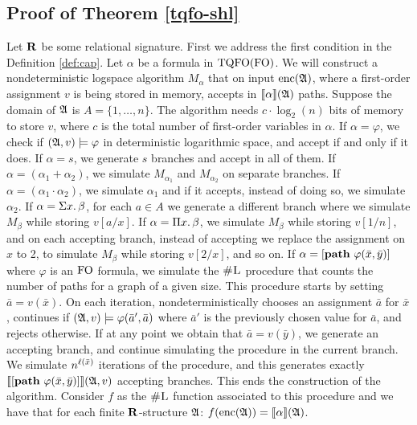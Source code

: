 \subsection*{Proof of Theorem \ref{tqfo-shl}}

Let $\mathbf{R}$ be some relational signature.  First we address the first condition in the Definition \ref{def:cap}. Let $\alpha$ be a formula in ${\rm TQFO}({\rm FO})$. We will construct a nondeterministic logspace algorithm $M_{\alpha}$ that on input ${\rm enc}(\mathfrak{A})$, where a first-order assignment $v$ is being stored in memory, accepts in ${\llbracket{}{\alpha}\rrbracket}(\mathfrak{A})$ paths. Suppose the domain of $\mathfrak{A}$ is $A = \{1,\ldots,n\}$. The algorithm needs $c\cdot\log_2(n)$ bits of memory to store $v$, where $c$ is the total number of first-order variables in $\alpha$. If $\alpha = \varphi$, we check if $(\mathfrak{A},v)\models\varphi$ in deterministic logarithmic space, and accept if and only if it does. If $\alpha = s$, we generate $s$ branches and accept in all of them. If $\alpha = (\alpha_1 + \alpha_2)$, we simulate $M_{\alpha_1}$ and $M_{\alpha_2}$ on separate branches. If $\alpha = (\alpha_1\cdot\alpha_2)$, we simulate $\alpha_1$ and if it accepts, instead of doing so, we simulate $\alpha_2$. If $\alpha = \Sigma{x}.\,\beta$, for each $a\in A$ we generate a different branch where we simulate $M_{\beta}$ while storing $v[a/x]$. If $\alpha = \Pi{x}.\,\beta$, we simulate $M_{\beta}$ while storing $v[1/n]$, and on each accepting branch, instead of accepting we replace the assignment on $x$ to 2, to simulate $M_{\beta}$ while storing $v[2/x]$, and so on. If $\alpha = [{\bf path} \,\, \varphi(\bar{x},\bar{y})]$ where $\varphi$ is an ${\rm FO}$ formula, we simulate the $\text{\sc \#L}$ procedure that counts the number of paths for a graph of a given size. This procedure starts by setting $\bar{a} = v(\bar{x})$. On each iteration, nondeterministically chooses an assignment $\bar{a}$ for $\bar{x}$, continues if $(\mathfrak{A},v)\models\varphi(\bar{a}',\bar{a})$ where $\bar{a}'$ is the previously chosen value for $\bar{a}$, and rejects otherwise. If at any point we obtain that $\bar{a} = v(\bar{y})$, we generate an accepting branch, and continue simulating the procedure in the current branch. We simulate $n^{\ell(\bar{x})}$ iterations of the procedure, and this generates exactly ${\llbracket{}{[{\bf path} \,\, \varphi(\bar{x},\bar{y})]}\rrbracket}(\mathfrak{A},v)$ accepting branches. This ends the construction of the algorithm. Consider $f$ as the $\text{\sc \#L}$ function associated to this procedure and we have that for each finite $\mathbf{R}$-structure $\mathfrak{A}$: $f({\rm enc}(\mathfrak{A})) = {\llbracket{}{\alpha}\rrbracket}(\mathfrak{A})$.

